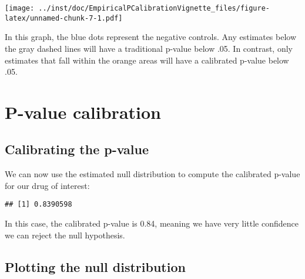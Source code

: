 \documentclass[
]{article}
\newenvironment{Shaded}{\begin{snugshade}}{\end{snugshade}}
\newcommand{\DataTypeTok}[1]{\textcolor[rgb]{0.13,0.29,0.53}{#1}}
\newcommand{\KeywordTok}[1]{\textcolor[rgb]{0.13,0.29,0.53}{\textbf{#1}}}
\newcommand{\NormalTok}[1]{#1}
\newcommand{\OperatorTok}[1]{\textcolor[rgb]{0.81,0.36,0.00}{\textbf{#1}}}
\newcommand{\StringTok}[1]{\textcolor[rgb]{0.31,0.60,0.02}{#1}}
\begin{document}
\begin{Shaded}
\end{Shaded}

\texttt{[image: ../inst/doc/EmpiricalPCalibrationVignette\_files/figure-latex/unnamed-chunk-7-1.pdf]}

In this graph, the blue dots represent the negative controls. Any
estimates below the gray dashed lines will have a traditional p-value
below .05. In contrast, only estimates that fall within the orange areas
will have a calibrated p-value below .05.

\hypertarget{p-value-calibration}{%
\section{P-value calibration}\label{p-value-calibration}}

\hypertarget{calibrating-the-p-value}{%
\subsection{Calibrating the p-value}\label{calibrating-the-p-value}}

We can now use the estimated null distribution to compute the calibrated
p-value for our drug of interest:

\begin{Shaded}
\end{Shaded}

\begin{verbatim}
## [1] 0.8390598
\end{verbatim}

In this case, the calibrated p-value is 0.84, meaning we have very
little confidence we can reject the null hypothesis.

\hypertarget{plotting-the-null-distribution-1}{%
\subsection{Plotting the null
distribution}\label{plotting-the-null-distribution-1}}
\end{document}
